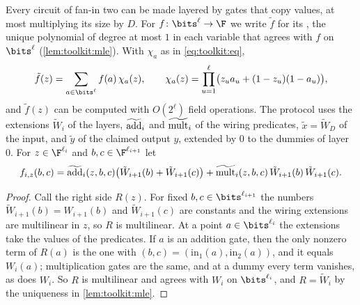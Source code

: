 \begin{refsection}
Every circuit of fan-in two can be made layered by gates that copy values, at most multiplying its size by $D$. For $f\colon\bits^\ell\to\F$ we write $\tilde f$ for its , the unique polynomial of degree at most $1$ in each variable that agrees with $f$ on $\bits^\ell$ (\cref{lem:toolkit:mle}). With $\chi_a$ as in \eqref{eq:toolkit:eq},
\[
\tilde f(z)=\sum_{a\in\bits^\ell}f(a)\,\chi_a(z),\qquad\chi_a(z)=\prod_{u=1}^\ell\bigl(z_ua_u+(1-z_u)(1-a_u)\bigr),
\]
and $\tilde f(z)$ can be computed with $O(2^\ell)$ field operations. The protocol uses the extensions $\tilde W_i$ of the layers, $\widetilde{\mathrm{add}}_i$ and $\widetilde{\mathrm{mult}}_i$ of the wiring predicates, $\tilde x=\tilde W_D$ of the input, and $\tilde y$ of the claimed output $y$, extended by $0$ to the dummies of layer $0$. For $z\in\F^{\ell_i}$ and $b,c\in\F^{\ell_{i+1}}$ let
\begin{equation}\label{eq:delegation:summand}
f_{i,z}(b,c)=\widetilde{\mathrm{add}}_i(z,b,c)\bigl(\tilde W_{i+1}(b)+\tilde W_{i+1}(c)\bigr)+\widetilde{\mathrm{mult}}_i(z,b,c)\,\tilde W_{i+1}(b)\,\tilde W_{i+1}(c).
\end{equation}


\begin{proof}
Call the right side $R(z)$. For fixed $b,c\in\bits^{\ell_{i+1}}$ the numbers $\tilde W_{i+1}(b)=W_{i+1}(b)$ and $\tilde W_{i+1}(c)$ are constants and the wiring extensions are multilinear in $z$, so $R$ is multilinear. At a point $a\in\bits^{\ell_i}$ the extensions take the values of the predicates. If $a$ is an addition gate, then the only nonzero term of $R(a)$ is the one with $(b,c)=(\mathrm{in}_1(a),\mathrm{in}_2(a))$, and it equals $W_i(a)$; multiplication gates are the same, and at a dummy every term vanishes, as does $W_i$. So $R$ is multilinear and agrees with $W_i$ on $\bits^{\ell_i}$, and $R=\tilde W_i$ by the uniqueness in \cref{lem:toolkit:mle}.
\end{proof}


\end{refsection}

